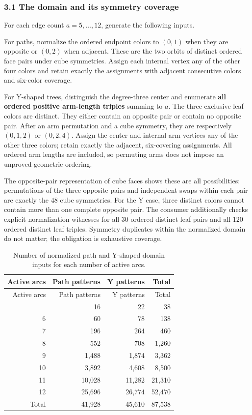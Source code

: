 \documentclass[
  11pt,
]{article}
\begin{document}
\subsubsection{3.1 The domain and its symmetry
coverage}\label{the-domain-and-its-symmetry-coverage}

For each edge count \(a=5,\ldots,12\), generate the following inputs.

For paths, normalize the ordered endpoint colors to \((0,1)\) when they
are opposite or \((0,2)\) when adjacent. These are the two orbits of
distinct ordered face pairs under cube symmetries. Assign each internal
vertex any of the other four colors and retain exactly the assignments
with adjacent consecutive colors and six-color coverage.

For Y-shaped trees, distinguish the degree-three center and enumerate
\textbf{all ordered positive arm-length triples} summing to \(a\). The
three exclusive leaf colors are distinct. They either contain an
opposite pair or contain no opposite pair. After an arm permutation and
a cube symmetry, they are respectively \((0,1,2)\) or \((0,2,4)\).
Assign the center and internal arm vertices any of the other three
colors; retain exactly the adjacent, six-covering assignments. All
ordered arm lengths are included, so permuting arms does not impose an
unproved geometric ordering.

The opposite-pair representation of cube faces shows these are all
possibilities: permutations of the three opposite pairs and independent
swaps within each pair are exactly the 48 cube symmetries. For the Y
case, three distinct colors cannot contain more than one complete
opposite pair. The consumer additionally checks explicit normalization
witnesses for all 30 ordered distinct leaf pairs and all 120 ordered
distinct leaf triples. Symmetry duplicates within the normalized domain
do not matter; the obligation is exhaustive coverage.

\begin{longtable}[]{@{}rrrr@{}}
\caption{Number of normalized path and Y-shaped domain inputs for each
number of active arcs.}\tabularnewline
\toprule\noalign{}
Active arcs & Path patterns & Y patterns & Total \\
\midrule\noalign{}
\endfirsthead
\toprule\noalign{}
Active arcs & Path patterns & Y patterns & Total \\
\midrule\noalign{}
\endhead
\bottomrule\noalign{}
\endlastfoot
5 & 16 & 22 & 38 \\
6 & 60 & 78 & 138 \\
7 & 196 & 264 & 460 \\
8 & 552 & 708 & 1,260 \\
9 & 1,488 & 1,874 & 3,362 \\
10 & 3,892 & 4,608 & 8,500 \\
11 & 10,028 & 11,282 & 21,310 \\
12 & 25,696 & 26,774 & 52,470 \\
Total & 41,928 & 45,610 & 87,538 \\
\end{longtable}
\end{document}
